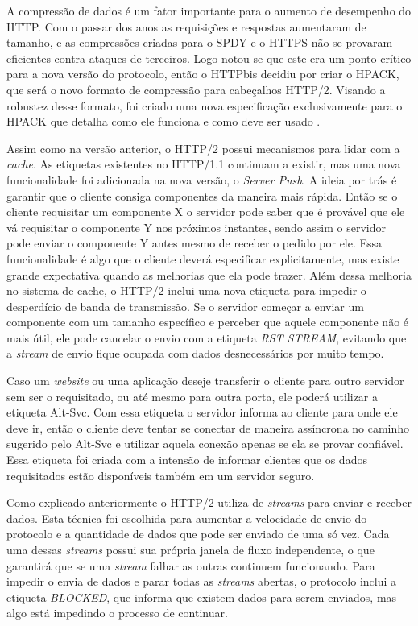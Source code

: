 A compressão de dados é um fator importante para o aumento de desempenho do HTTP. Com o passar dos anos as requisições e respostas aumentaram de tamanho, e as compressões criadas para o SPDY e o HTTPS não se provaram eficientes contra ataques de terceiros. Logo notou-se que este era um ponto crítico para a nova versão do protocolo, então o HTTPbis decidiu por criar o HPACK, que será o novo formato de compressão para cabeçalhos HTTP/2. Visando a robustez desse formato, foi criado uma nova especificação exclusivamente para o HPACK que detalha como ele funciona e como deve ser usado \cite{HPACKSpec}.

Assim como na versão anterior, o HTTP/2 possui mecanismos para lidar com a \textit{cache}. As etiquetas existentes no HTTP/1.1 continuam a existir, mas uma nova funcionalidade foi adicionada na nova versão, o \textit{Server Push}. A ideia por trás é garantir que o cliente consiga componentes da maneira mais rápida. Então se o cliente requisitar um componente X o servidor pode saber que é provável que ele vá requisitar o componente Y nos próximos instantes, sendo assim o servidor pode enviar o componente Y antes mesmo de receber o pedido por ele. Essa funcionalidade é algo que o cliente deverá especificar explicitamente, mas existe grande expectativa quando as melhorias que ela pode trazer. Além dessa melhoria no sistema de cache, o HTTP/2 inclui uma nova etiqueta para impedir o desperdício de banda de transmissão. Se o servidor começar a enviar um componente com um tamanho específico e perceber que aquele componente não é mais útil, ele pode cancelar o envio com a etiqueta \textit{RST STREAM}, evitando que a \textit{stream} de envio fique ocupada com dados desnecessários por muito tempo.

Caso um \textit{website} ou uma aplicação deseje transferir o cliente para outro servidor sem ser o requisitado, ou até mesmo para outra porta, ele poderá utilizar a etiqueta Alt-Svc. Com essa etiqueta o servidor informa ao cliente para onde ele deve ir, então o cliente deve tentar se conectar de maneira assíncrona no caminho sugerido pelo Alt-Svc e utilizar aquela conexão apenas se ela se provar confiável. Essa etiqueta foi criada com a intensão de informar clientes que os dados requisitados estão disponíveis também em um servidor seguro.

Como explicado anteriormente o HTTP/2 utiliza de \textit{streams} para enviar e receber dados. Esta técnica foi escolhida para aumentar a velocidade de envio do protocolo e a quantidade de dados que pode ser enviado de uma só vez. Cada uma dessas \textit{streams} possui sua própria janela de fluxo independente, o que garantirá que se uma \textit{stream} falhar as outras continuem funcionando. Para impedir o envia de dados e parar todas as \textit{streams} abertas, o protocolo inclui a etiqueta \textit{BLOCKED}, que informa que existem dados para serem enviados, mas algo está impedindo o processo de continuar.

